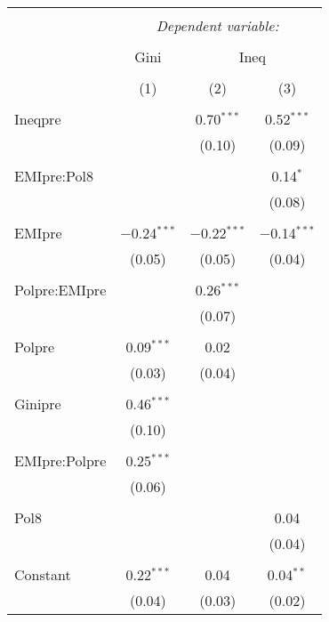 
\begin{table}[!htbp] \centering 
  \caption{} 
  \label{} 
\begin{tabular}{@{\extracolsep{5pt}}lccc} 
\\[-1.8ex]\hline 
\hline \\[-1.8ex] 
 & \multicolumn{3}{c}{\textit{Dependent variable:}} \\ 
\cline{2-4} 
\\[-1.8ex] & Gini & \multicolumn{2}{c}{Ineq} \\ 
\\[-1.8ex] & (1) & (2) & (3)\\ 
\hline \\[-1.8ex] 
 Ineqpre &  & 0.70$^{***}$ & 0.52$^{***}$ \\ 
  &  & (0.10) & (0.09) \\ 
  & & & \\ 
 EMIpre:Pol8 &  &  & 0.14$^{*}$ \\ 
  &  &  & (0.08) \\ 
  & & & \\ 
 EMIpre & $-$0.24$^{***}$ & $-$0.22$^{***}$ & $-$0.14$^{***}$ \\ 
  & (0.05) & (0.05) & (0.04) \\ 
  & & & \\ 
 Polpre:EMIpre &  & 0.26$^{***}$ &  \\ 
  &  & (0.07) &  \\ 
  & & & \\ 
 Polpre & 0.09$^{***}$ & 0.02 &  \\ 
  & (0.03) & (0.04) &  \\ 
  & & & \\ 
 Ginipre & 0.46$^{***}$ &  &  \\ 
  & (0.10) &  &  \\ 
  & & & \\ 
 EMIpre:Polpre & 0.25$^{***}$ &  &  \\ 
  & (0.06) &  &  \\ 
  & & & \\ 
 Pol8 &  &  & 0.04 \\ 
  &  &  & (0.04) \\ 
  & & & \\ 
 Constant & 0.22$^{***}$ & 0.04 & 0.04$^{**}$ \\ 
  & (0.04) & (0.03) & (0.02) \\ 

\end{tabular}
\end{table}
